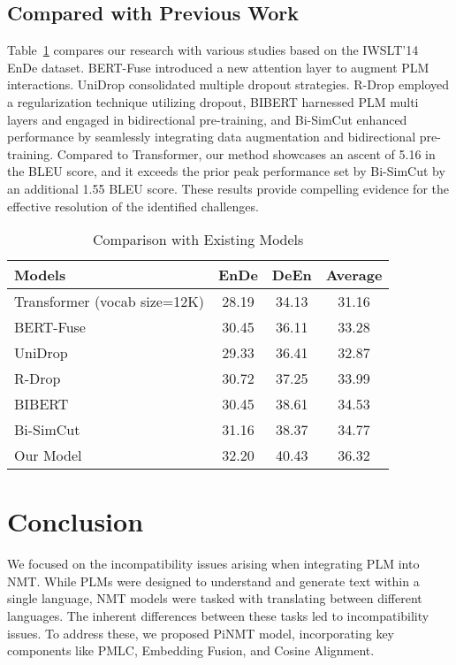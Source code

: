 \documentclass[conference]{IEEEtran}
\begin{document}
\subsection{Compared with Previous Work}
Table~\ref{tab:8} compares our research with various studies based on the IWSLT'14 EnDe dataset. BERT-Fuse \cite{zhu2020incorporating} introduced a new attention layer to augment PLM interactions. UniDrop \cite{wu2021unidrop}  consolidated multiple dropout strategies. R-Drop \cite{wu2021r}  employed a regularization technique utilizing dropout, BIBERT \cite{xu2021bibert} harnessed PLM multi layers and engaged in bidirectional pre-training, and Bi-SimCut \cite{gao2022bi} enhanced performance by seamlessly integrating data augmentation and bidirectional pre-training. Compared to Transformer, our method showcases an ascent of 5.16 in the BLEU score, and it exceeds the prior peak performance set by Bi-SimCut by an additional 1.55 BLEU score. These results provide compelling evidence for the effective resolution of the identified challenges.

\begin{table}[!tb]
    \centering
    \caption{Comparison with Existing Models}
    \label{tab:8}
    \begin{tabular}{|l|c|c|c|}
        \hline
        \textbf{Models} & \textbf{EnDe} & \textbf{DeEn} & \textbf{Average} \\
        \hline
        Transformer (vocab size=12K) & 28.19 & 34.13 & 31.16 \\
        BERT-Fuse & 30.45 & 36.11 & 33.28 \\
        UniDrop & 29.33 & 36.41 & 32.87 \\
        R-Drop & 30.72 & 37.25 & 33.99 \\
        BIBERT & 30.45 & 38.61 & 34.53 \\
        Bi-SimCut & 31.16 & 38.37 & 34.77 \\
        \hline
        Our Model & 32.20 & 40.43 & 36.32 \\
        \hline
    \end{tabular}
\end{table}


\section{Conclusion}
We focused on the incompatibility issues arising when integrating PLM into NMT. While PLMs were designed to understand and generate text within a single language, NMT models were tasked with translating between different languages. The inherent differences between these tasks led to incompatibility issues. To address these, we proposed PiNMT model, incorporating key components like PMLC, Embedding Fusion, and Cosine Alignment.
\end{document}
